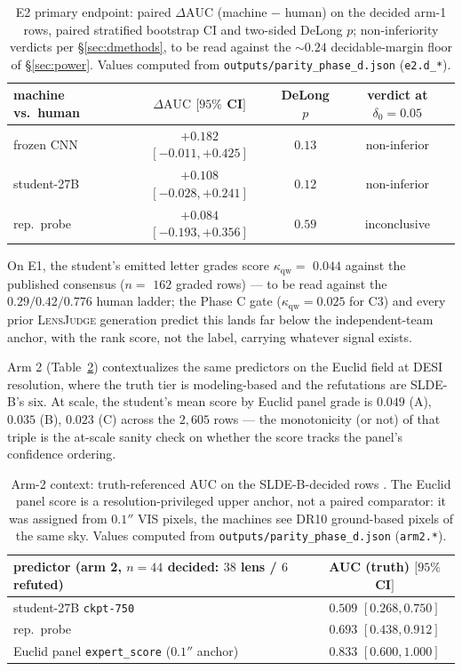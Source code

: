 \documentclass[11pt,letterpaper]{article}
\newcommand{\lj}{\textsc{LensJudge}}
\newcommand{\qwk}{\ensuremath{\kappa_{\mathrm{qw}}}}
\newcommand{\dauc}{\ensuremath{\Delta\mathrm{AUC}}}
\newcommand{\pdDaucCnn}{$+0.182$ $[-0.011, +0.425]$}     %
\newcommand{\pdDelongCnn}{$0.13$}         %
\newcommand{\pdVerdictCnn}{non-inferior}        %
\newcommand{\pdDaucStudent}{$+0.108$ $[-0.028, +0.241]$} %
\newcommand{\pdDelongStudent}{$0.12$}
\newcommand{\pdVerdictStudent}{non-inferior}
\newcommand{\pdDaucRep}{$+0.084$ $[-0.193, +0.356]$}     %
\newcommand{\pdDelongRep}{$0.59$}
\newcommand{\pdVerdictRep}{inconclusive}
\newcommand{\pdQwkStudent}{$0.044$}  %
\newcommand{\pdQwkStudentN}{$162$}       %
\newcommand{\pdArmTwoStudent}{$0.509$ $[0.268, 0.750]$} %
\newcommand{\pdArmTwoRep}{$0.693$ $[0.438, 0.912]$}     %
\newcommand{\pdArmTwoExpert}{$0.833$ $[0.600, 1.000]$}  %
\newcommand{\pdStratA}{$0.049$}            %
\newcommand{\pdStratB}{$0.035$}            %
\newcommand{\pdStratC}{$0.023$}            %
\begin{document}
\begin{table}[t]
\centering\small
\begin{tabular}{lccc}
\toprule
machine vs.\ human & $\dauc$ $[95\%$ CI$]$ & DeLong $p$ & verdict at $\delta_0=0.05$ \\
\midrule
frozen CNN    & \pdDaucCnn     & \pdDelongCnn     & \pdVerdictCnn \\
student-27B   & \pdDaucStudent & \pdDelongStudent & \pdVerdictStudent \\
rep.\ probe   & \pdDaucRep     & \pdDelongRep     & \pdVerdictRep \\
\bottomrule
\end{tabular}
\caption{E2 primary endpoint: paired $\dauc$ (machine $-$ human) on the decided arm-1
rows, paired stratified bootstrap CI and two-sided DeLong $p$; non-inferiority verdicts
per \S\ref{sec:dmethods}, to be read against the $\sim$$0.24$ decidable-margin floor of
\S\ref{sec:power}. Values computed from
\texttt{outputs/parity\_phase\_d.json} (\texttt{e2.d\_*}).}\label{tab:e2dauc}
\end{table}

On E1, the student's emitted letter grades score $\qwk=$ \pdQwkStudent{} against the
published consensus ($n=$ \pdQwkStudentN{} graded rows) --- to be read against the
$0.29/0.42/0.776$ human ladder; the Phase C gate ($\qwk=0.025$ for C3) and every prior
\lj{} generation predict this lands far below the independent-team anchor, with the
rank score, not the label, carrying whatever signal exists.

Arm 2 (Table~\ref{tab:arm2}) contextualizes the same predictors on the Euclid field at
DESI resolution, where the truth tier is modeling-based and the refutations are
SLDE-B's six. At scale, the student's mean score by Euclid panel grade is
\pdStratA{} (A), \pdStratB{} (B), \pdStratC{} (C) across the $2{,}605$ rows --- the
monotonicity (or not) of that triple is the at-scale sanity check on whether the
score tracks the panel's confidence ordering.

\begin{table}[t]
\centering\small
\begin{tabular}{lc}
\toprule
predictor (arm 2, $n=44$ decided: $38$ lens / $6$ refuted) & AUC (truth) $[95\%$ CI$]$ \\
\midrule
student-27B \texttt{ckpt-750}                    & \pdArmTwoStudent \\
rep.\ probe                                      & \pdArmTwoRep \\
Euclid panel \texttt{expert\_score} ($0.1''$ anchor) & \pdArmTwoExpert \\
\bottomrule
\end{tabular}
\caption{Arm-2 context: truth-referenced AUC on the SLDE-B-decided rows
\citep{euclidq1sldeB}. The Euclid panel score is a resolution-privileged upper anchor,
not a paired comparator: it was assigned from $0.1''$ VIS pixels, the machines see
DR10 ground-based pixels of the same sky. Values computed from
\texttt{outputs/parity\_phase\_d.json} (\texttt{arm2.*}).}\label{tab:arm2}
\end{table}
\end{document}
